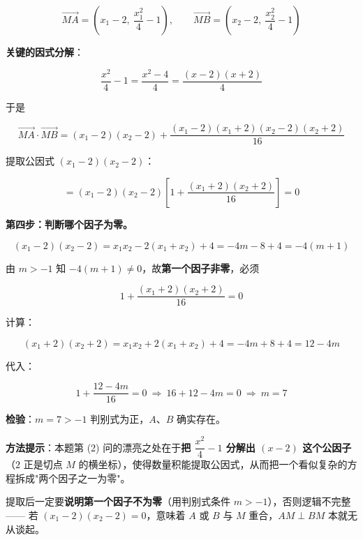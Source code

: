 \begin{answer}
\nopagebreak[4]
\[\overrightarrow{MA}=\left(x_1-2,\ \frac{x_1^{2}}4-1\right),\qquad \overrightarrow{MB}=\left(x_2-2,\ \frac{x_2^{2}}4-1\right)\]

\textbf{关键的因式分解}：

\nopagebreak[4]
\[\frac{x^{2}}4-1=\frac{x^{2}-4}4=\frac{(x-2)(x+2)}4\]

于是

\nopagebreak[4]
\[\overrightarrow{MA}\cdot\overrightarrow{MB}=\left(x_1-2\right)\left(x_2-2\right)+\frac{\left(x_1-2\right)\left(x_1+2\right)\left(x_2-2\right)\left(x_2+2\right)}{16}\]

提取公因式 $\left(x_1-2\right)\left(x_2-2\right)$：

\nopagebreak[4]
\[=\left(x_1-2\right)\left(x_2-2\right)\left[1+\frac{\left(x_1+2\right)\left(x_2+2\right)}{16}\right]=0\]

\textbf{第四步：判断哪个因子为零。}

\nopagebreak[4]
\[\left(x_1-2\right)\left(x_2-2\right)=x_1x_2-2\left(x_1+x_2\right)+4=-4m-8+4=-4(m+1)\]

由 $m>-1$ 知 $-4(m+1)\ne0$，故\textbf{第一个因子非零}，必须

\nopagebreak[4]
\[1+\frac{\left(x_1+2\right)\left(x_2+2\right)}{16}=0\]

计算：

\nopagebreak[4]
\[\left(x_1+2\right)\left(x_2+2\right)=x_1x_2+2\left(x_1+x_2\right)+4=-4m+8+4=12-4m\]

代入：

\nopagebreak[4]
\[1+\frac{12-4m}{16}=0\ \Longrightarrow\ 16+12-4m=0\ \Longrightarrow\ m=7\]

\textbf{检验}：$m=7>-1$  判别式为正，$A$、$B$ 确实存在。

\begin{gktip}
\textbf{方法提示}：本题第 (2) 问的漂亮之处在于\textbf{把 $\dfrac{x^{2}}4-1$ 分解出 $(x-2)$ 这个公因子}（$2$ 正是切点 $M$ 的横坐标），使得数量积能提取公因式，从而把一个看似复杂的方程拆成"两个因子之一为零"。

提取后一定要\textbf{说明第一个因子不为零}（用判别式条件 $m>-1$），否则逻辑不完整 —— 若 $\left(x_1-2\right)\left(x_2-2\right)=0$，意味着 $A$ 或 $B$ 与 $M$ 重合，$AM\perp BM$ 本就无从谈起。
\end{gktip}



\par\medskip

\end{answer}
